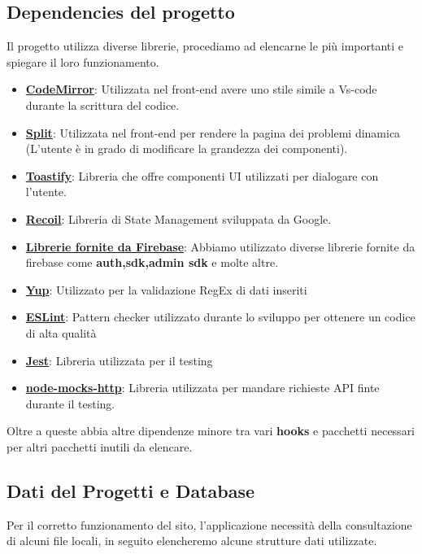 \documentclass[11pt, a4paper]{article}
\theoremstyle{definition}
\begin{document}
\subsection{Dependencies del progetto}
Il progetto utilizza diverse librerie, procediamo ad elencarne le più importanti e spiegare il loro funzionamento.
\begin{itemize}
  \item \href{https://codemirror.net/}{\textbf{CodeMirror}}: Utilizzata nel front-end avere uno stile simile a Vs-code durante la scrittura del codice.
  \item \href{https://split.js.org/}{\textbf{Split}}: Utilizzata nel front-end per rendere la pagina dei problemi dinamica (L'utente è in grado di modificare la grandezza dei componenti).
  \item \href{https://www.npmjs.com/package/react-toastify}{\textbf{Toastify}}: Libreria che offre componenti UI utilizzati per dialogare con l'utente.
  \item \href{https://recoiljs.org/}{\textbf{Recoil}}: Libreria di State Management sviluppata da Google.
  \item \href{https://firebase.google.com/docs/build}{\textbf{Librerie fornite da Firebase}}: Abbiamo utilizzato diverse librerie fornite da firebase come \textbf{auth,sdk,admin sdk} e molte altre.
  \item \href{https://www.npmjs.com/package/yup}{\textbf{Yup}}: Utilizzato per la validazione RegEx di dati inseriti
  \item \href{https://eslint.org/}{\textbf{ESLint}}: Pattern checker utilizzato durante lo sviluppo per ottenere un codice di alta qualità
  \item \href{https://jestjs.io/}{\textbf{Jest}}: Libreria utilizzata per il testing
  \item \href{https://www.npmjs.com/package/node-mocks-http}{\textbf{node-mocks-http}}: Libreria utilizzata per mandare richieste API finte durante il testing.
\end{itemize}
Oltre a queste abbia altre dipendenze minore tra vari \textbf{hooks} e pacchetti necessari per altri pacchetti inutili da elencare.
\subsection{Dati del Progetti e Database}
Per il corretto funzionamento del sito, l'applicazione necessità della consultazione di alcuni file locali, in seguito elencheremo alcune strutture dati utilizzate.
\end{document}
